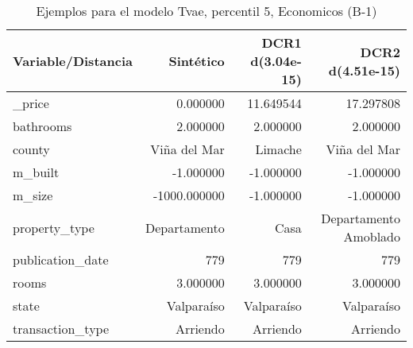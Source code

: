 \begin{table}[H]
\centering
\fontsize{10}{14}\selectfont
\caption{Ejemplos para el modelo Tvae, percentil 5, Economicos (B-1)}
\label{table-example-economicos-b-1-tvae-5p}
\begin{tabular}{|l|r|r|r|}
\hline
\rowcolor[gray]{0.8}
Variable/Distancia & Sintético & DCR1 d(3.04e-15) & DCR2 d(4.51e-15) \\
\hline \_price & \cellcolor[rgb]{0.9, 0.54, 0.52} 0.000000 & 11.649544 & 17.297808 \\
\hline bathrooms & \cellcolor[rgb]{0.9, 0.54, 0.52} 2.000000 & \cellcolor[rgb]{0.9, 0.54, 0.52} 2.000000 & \cellcolor[rgb]{0.9, 0.54, 0.52} 2.000000 \\
\hline county & \cellcolor[rgb]{0.9, 0.54, 0.52} Viña del Mar & Limache & \cellcolor[rgb]{0.9, 0.54, 0.52} Viña del Mar \\
\hline m\_built & \cellcolor[rgb]{0.9, 0.54, 0.52} -1.000000 & \cellcolor[rgb]{0.9, 0.54, 0.52} -1.000000 & \cellcolor[rgb]{0.9, 0.54, 0.52} -1.000000 \\
\hline m\_size & \cellcolor[rgb]{0.9, 0.54, 0.52} -1000.000000 & \cellcolor[rgb]{0.9, 0.54, 0.52} -1.000000 & \cellcolor[rgb]{0.9, 0.54, 0.52} -1.000000 \\
\hline property\_type & \cellcolor[rgb]{0.9, 0.54, 0.52} Departamento & Casa & Departamento Amoblado \\
\hline publication\_date & \cellcolor[rgb]{0.9, 0.54, 0.52} 779 & \cellcolor[rgb]{0.9, 0.54, 0.52} 779 & \cellcolor[rgb]{0.9, 0.54, 0.52} 779 \\
\hline rooms & \cellcolor[rgb]{0.9, 0.54, 0.52} 3.000000 & \cellcolor[rgb]{0.9, 0.54, 0.52} 3.000000 & \cellcolor[rgb]{0.9, 0.54, 0.52} 3.000000 \\
\hline state & \cellcolor[rgb]{0.9, 0.54, 0.52} Valparaíso & \cellcolor[rgb]{0.9, 0.54, 0.52} Valparaíso & \cellcolor[rgb]{0.9, 0.54, 0.52} Valparaíso \\
\hline transaction\_type & \cellcolor[rgb]{0.9, 0.54, 0.52} Arriendo & \cellcolor[rgb]{0.9, 0.54, 0.52} Arriendo & \cellcolor[rgb]{0.9, 0.54, 0.52} Arriendo \\
\hline
\end{tabular}
\end{table}
